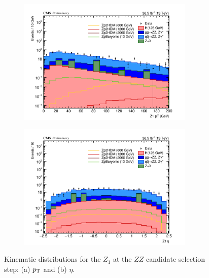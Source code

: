 \begin{enumerate}
\begin{figure}[tbh]
\begin{subfigure}{0.50\textwidth}
\centering
\includegraphics[width=3.3in]{figures/hist_hPtZ1_5.png}
\caption{}
\end{subfigure}
\begin{subfigure}{0.50\textwidth}
\centering
\includegraphics[width=3.3in]{figures/hist_hYZ1_5.png}
\caption{}
\end{subfigure}
\caption{Kinematic distributions for the $Z_1$ at the $ZZ$ candidate selection step: (a) $p_{\rm{T}}$ and (b) $\eta$.}
\label{fig:z15kin}
\end{figure}


\end{enumerate}
